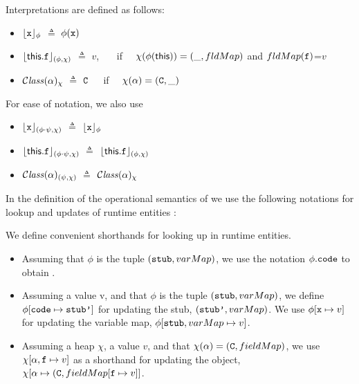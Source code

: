 \begin{definition}[Interpretations]
Interpretations are defined as follows:

\begin{itemize}
\item 
${\lfloor{ {{\mbox{\tt{x}}}}}\rfloor_{\phi}} $ $\triangleq$ $\phi({\mbox{\tt{x}}})$  
\item
${\lfloor{ {{\bf{\sf {this}}}.{\mbox{\tt{f}}}}}\rfloor_{(\phi,\chi)}} $ $\triangleq$ $v$, \ \ \ if \ \ $\chi(\phi({\bf{\sf {this}}}))=(\_, fldMap)$ and $fldMap({\mbox{\tt{f}}})$=$v$ 
\item
${\mathcal C}{\mathit{lass}}(\alpha)_{\chi} $ $\triangleq$ ${\mbox{\tt{C}}}$\  \ \ if \ \ $\chi(\alpha)=({\mbox{\tt{C}}},\_)$ 

\end{itemize}

\noindent
For ease of notation, we also use
\begin{itemize}
\item
${\lfloor{ {{\mbox{\tt{x}}}}}\rfloor_{(\phi\cdot\psi,\chi)}} $ $\triangleq$ ${\lfloor{ {{\mbox{\tt{x}}}}}\rfloor_{\phi}} $
\item
${\lfloor{ {{\bf{\sf {this}}}.{\mbox{\tt{f}}}}}\rfloor_{(\phi\cdot\psi,\chi)}} $ $\triangleq$ ${\lfloor{ {{\bf{\sf {this}}}.{\mbox{\tt{f}}}}}\rfloor_{(\phi,\chi)}} $
\item
${\mathcal C}{\mathit{lass}}(\alpha)_{(\psi,\chi)} $ $\triangleq$ ${\mathcal C}{\mathit{lass}}(\alpha)_{\chi} $ 
\end{itemize}

\end{definition}

In the definition of the operational semantics of \LangOO we use the following notations for lookup and updates of runtime entities : 

\begin{definition}
We define convenient shorthands for looking up in  runtime entities. 
\begin{itemize}
\item
Assuming that $\phi$ is the tuple  $({\mbox{\tt{stub}}}, varMap)$, we use the notation  $\phi.{\mbox{\tt{code}}}$ to obtain .
\item
Assuming a value v, and that $\phi$ is the tuple  $({\mbox{\tt{stub}}}, varMap)$, we define $\phi[{\mbox{\tt{code}}}\mapsto{\mbox{\tt{stub'}}}]$ for updating the stub, \ie   
$({\mbox{\tt{stub'}}}, varMap)$.   We use  $\phi[{\mbox{\tt{x}}} \mapsto v]$  for updating the variable map, \ie  $\phi[{\mbox{\tt{stub}}}, varMap\mapsto v]$.
\item
Assuming a heap $\chi$, a value $v$, and   that $\chi(\alpha)=({\mbox{\tt{C}}}, fieldMap)$,
we use $\chi[\alpha,{\mbox{\tt{f}}} \mapsto v]$ as a shorthand for updating the object, \ie $\chi[\alpha \mapsto ({\mbox{\tt{C}}}, fieldMap[{\mbox{\tt{f}}} \mapsto v]]$.
\end{itemize}

\end{definition}






